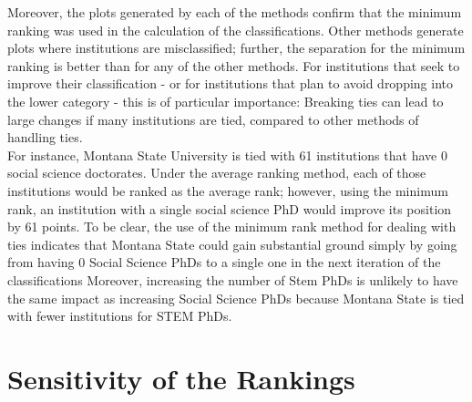 \documentclass{article}
\begin{document}
Moreover, the plots generated by each of the methods confirm that the minimum ranking was used in the calculation of the classifications. Other methods generate plots where institutions are misclassified; further, the separation for the minimum ranking is better than for any of the other methods. For institutions that seek to improve their classification - or for institutions that plan to avoid dropping into the lower category - this is of particular importance: Breaking ties can lead to large changes if many institutions are tied, compared to other methods of handling ties. \\
For instance, Montana State University is tied with 61 institutions that have 0 social science doctorates. Under the average ranking method, each of those institutions would be ranked as the average rank; however, using the minimum rank, an institution with a single social science PhD would improve its position by 61 points. To be clear, the use of the minimum rank method for dealing with ties indicates that Montana State could gain substantial ground simply by going from having 0 Social Science PhDs to a single one in the next iteration of the classifications Moreover, increasing the number of Stem PhDs is unlikely to have the same impact as increasing Social Science PhDs because Montana State is tied with fewer institutions for STEM PhDs. 




\pagebreak
\section{Sensitivity of the Rankings}
\end{document}
